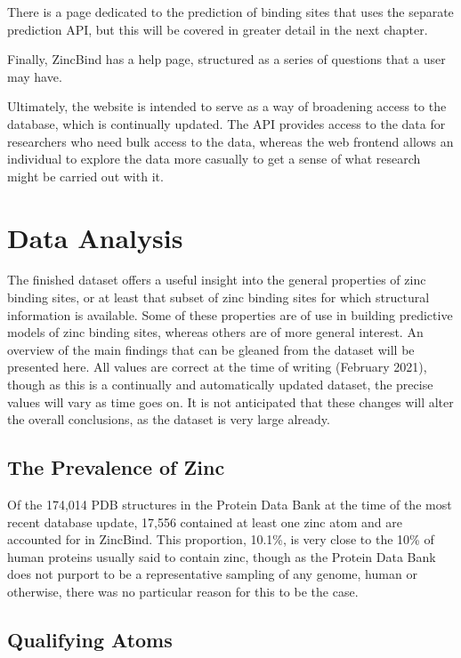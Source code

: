 There is a page dedicated to the prediction of binding sites that uses the separate prediction API, but this will be covered in greater detail in the next chapter.

Finally, ZincBind has a help page, structured as a series of questions that a user may have.

Ultimately, the website is intended to serve as a way of broadening access to the database, which is continually updated. The API provides access to the data for researchers who need bulk access to the data, whereas the web frontend allows an individual to explore the data more casually to get a sense of what research might be carried out with it.

\section{Data Analysis}

The finished dataset offers a useful insight into the general properties of zinc binding sites, or at least that subset of zinc binding sites for which structural information is available. Some of these properties are of use in building predictive models of zinc binding sites, whereas others are of more general interest. An overview of the main findings that can be gleaned from the dataset will be presented here. All values are correct at the time of writing (February 2021), though as this is a continually and automatically updated dataset, the precise values will vary as time goes on. It is not anticipated that these changes will alter the overall conclusions, as the dataset is very large already.

\subsection{The Prevalence of Zinc}

Of the 174,014 PDB structures in the Protein Data Bank at the time of the most recent database update, 17,556 contained at least one zinc atom and are accounted for in ZincBind. This proportion, 10.1\%, is very close to the 10\% of human proteins usually said to contain zinc, though as the Protein Data Bank does not purport to be a representative sampling of any genome, human or otherwise, there was no particular reason for this to be the case.

\subsection{Qualifying Atoms}


